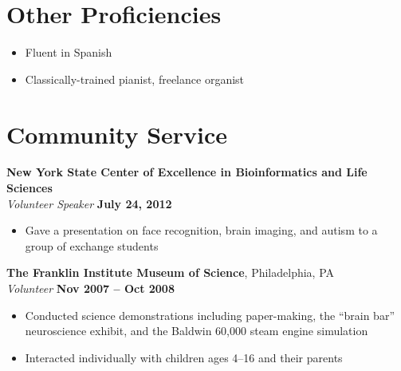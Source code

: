 \documentclass[margin]{res}
\begin{document}
\begin{resume}


\section{Other Proficiencies}
\begin{itemize} \itemsep -2pt
 \item Fluent in Spanish
 \item Classically-trained pianist, freelance organist
\end{itemize}


\section{Community Service}
{\bf New York State Center of Excellence in Bioinformatics and Life Sciences} \\
 {\it Volunteer Speaker} \hfill {\bf July 24, 2012}
 \begin{itemize} \itemsep -2pt
  \item Gave a presentation on face recognition, brain imaging, and autism to a group of exchange students
 \end{itemize}

{\bf The Franklin Institute Museum of Science}, Philadelphia, PA\\
{\it Volunteer} \hfill {\bf Nov 2007 -- Oct 2008}
 \begin{itemize} \itemsep -2pt
  \item Conducted science demonstrations including paper-making, the ``brain bar'' neuroscience exhibit, and the Baldwin 60,000 steam engine simulation
  \item Interacted individually with children ages 4--16 and their parents
 \end{itemize}


\end{resume}
\end{document}
